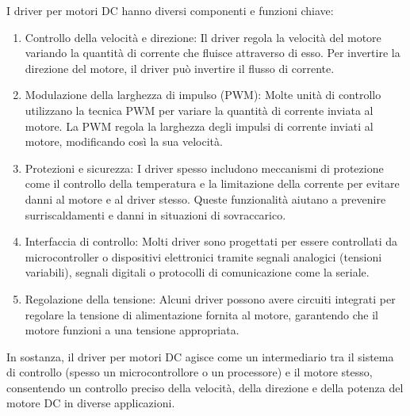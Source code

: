\documentclass{article}
\begin{document}
I driver per motori DC hanno diversi componenti e funzioni chiave:
\begin{enumerate}
    \item Controllo della velocità e direzione: Il driver regola la velocità del motore variando la quantità di corrente che fluisce attraverso di esso. Per invertire la direzione del motore, il driver può invertire il flusso di corrente.
    \item Modulazione della larghezza di impulso (PWM): Molte unità di controllo utilizzano la tecnica PWM per variare la quantità di corrente inviata al motore. La PWM regola la larghezza degli impulsi di corrente inviati al motore, modificando così la sua velocità.
    \item Protezioni e sicurezza: I driver spesso includono meccanismi di protezione come il controllo della temperatura e la limitazione della corrente per evitare danni al motore e al driver stesso. Queste funzionalità aiutano a prevenire surriscaldamenti e danni in situazioni di sovraccarico.
    \item Interfaccia di controllo: Molti driver sono progettati per essere controllati da microcontroller o dispositivi elettronici tramite segnali analogici (tensioni variabili), segnali digitali o protocolli di comunicazione come la seriale.
    \item Regolazione della tensione: Alcuni driver possono avere circuiti integrati per regolare la tensione di alimentazione fornita al motore, garantendo che il motore funzioni a una tensione appropriata.
\end{enumerate}

In sostanza, il driver per motori DC agisce come un intermediario tra il sistema di controllo (spesso un microcontrollore o un processore) e il motore stesso, consentendo un controllo preciso della velocità, della direzione e della potenza del motore DC in diverse applicazioni.

\vspace{0.5cm}
\end{document}
